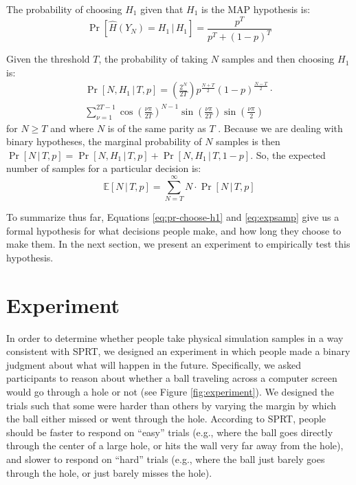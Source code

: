 \documentclass[10pt,letterpaper]{article}
\begin{document}
The probability of choosing $H_1$ given that $H_1$ is the MAP hypothesis is:
\begin{equation}
\Pr[\hat{H}(Y_N)=H_1\,|\,H_1]=\frac{p^T}{p^T+(1-p)^T}
\label{eq:pr-choose-h1}
\end{equation}

Given the threshold $T$, the probability of taking $N$ samples and then choosing $H_1$ is:
\begin{multline}
\Pr[N,H_1\,|\,T,p]=\left(\frac{2^N}{2T}\right)p^{\frac{N+T}{2}}(1-p)^{\frac{N-T}{2}}\cdot{}\\
\sum_{\nu=1}^{2T-1}\cos\left(\frac{\nu\pi}{2T}\right)^{N-1}\sin\left(\frac{\nu\pi}{2T}\right)\sin\left(\frac{\nu\pi}{2}\right)
\end{multline}
for $N\geq T$ and where $N$ is of the same parity as $T$ \cite[ch.~XIV, eq. 5.7]{Feller:1968ut}. 
Because we are dealing with binary hypotheses, the marginal probability of $N$ samples is then $\Pr[N\,|\,T,p]=\Pr[N,H_1\,|\,T,p]+\Pr[N,H_1\,|\,T,1-p]$.
So, the expected number of samples for a particular decision is:
\begin{equation}
\mathbb{E}[N\,|\,T,p]=\sum_{N=T}^\infty N\cdot{}\Pr[N\,|\,T,p]
\label{eq:expsamp}
\end{equation}

To summarize thus far, Equations \ref{eq:pr-choose-h1} and \ref{eq:expsamp} give us a formal hypothesis for what decisions people make, and how long they choose to make them. 
In the next section, we present an experiment to empirically test this hypothesis.

\section{Experiment}

In order to determine whether people take physical simulation samples in a way consistent with SPRT, we designed an experiment in which people made a binary judgment about what will happen in the future.
Specifically, we asked participants to reason about whether a ball traveling across a computer screen would go through a hole or not (see Figure \ref{fig:experiment}).
We designed the trials such that some were harder than others by varying the margin by which the ball either missed or went through the hole.
According to SPRT, people should be faster to respond on ``easy'' trials (e.g., where the ball goes directly through the center of a large hole, or hits the wall very far away from the hole), and slower to respond on ``hard'' trials (e.g., where the ball just barely goes through the hole, or just barely misses the hole).
\end{document}
